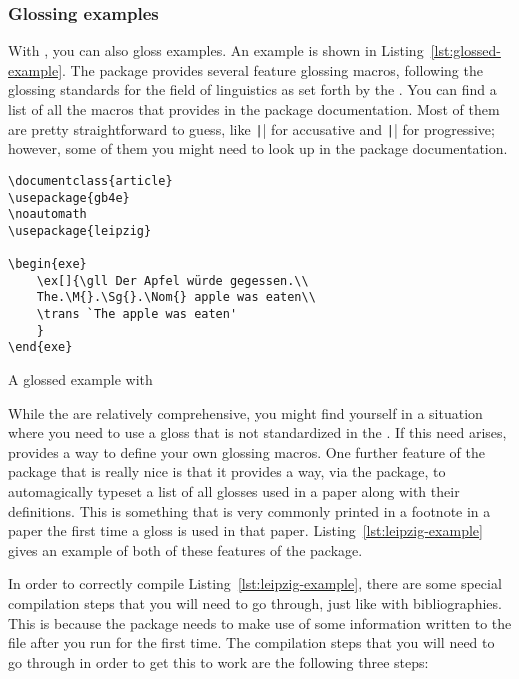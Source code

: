 \subsubsection{Glossing examples}
\label{subsubsec:glossing-examples}

With , you can also gloss examples.
An example is shown in Listing~\ref{lst:glossed-example}.
The package  provides several feature glossing macros, following the glossing standards for the field of linguistics as set forth by the \LGR.
You can find a list of all the macros that  provides in the package documentation.
Most of them are pretty straightforward to guess, like \texttt|\Acc{}| for accusative and \texttt|\Prog{}| for progressive; however, some of them you might need to look up in the package documentation.

\begin{listing}[htbp]
	\centering
	\begin{verbatim}
\documentclass{article}
\usepackage{gb4e}
\noautomath
\usepackage{leipzig}

\begin{exe}
    \ex[]{\gll Der Apfel würde gegessen.\\
    The.\M{}.\Sg{}.\Nom{} apple was eaten\\
    \trans `The apple was eaten'
    }
\end{exe}

	\end{verbatim}
	\caption{A glossed example with }
	\label{lst:glossed-example}
\end{listing}

While the \LGR{} are relatively comprehensive, you might find yourself in a situation where you need to use a gloss that is not standardized in the \LGR.
If this need arises,  provides a way to define your own glossing macros.
One further feature of the  package that is really nice is that it provides a way, via the  package, to automagically typeset a list of all glosses used in a paper along with their definitions.
This is something that is very commonly printed in a footnote in a paper the first time a gloss is used in that paper.
Listing~\ref{lst:leipzig-example} gives an example of both of these features of the package.

In order to correctly compile Listing~\ref{lst:leipzig-example}, there are some special compilation steps that you will need to go through, just like with bibliographies.
This is because the  package needs to make use of some information written to the  file after you run  for the first time.
The compilation steps that you will need to go through in order to get this to work are the following three steps:

